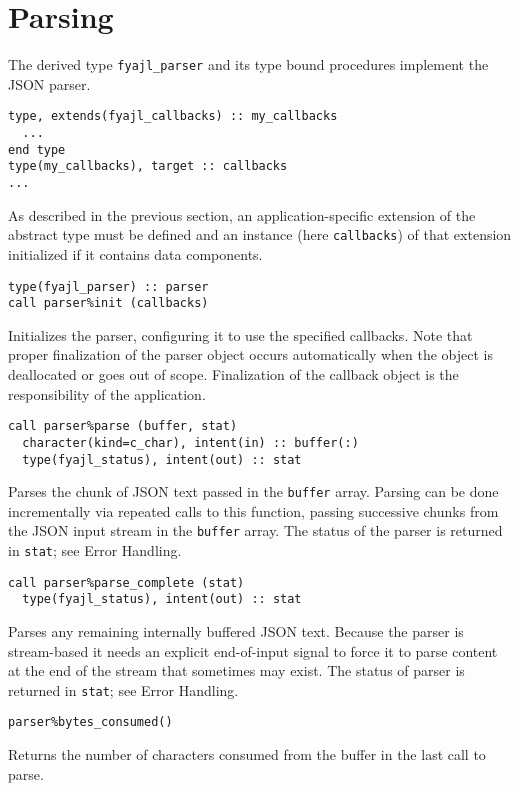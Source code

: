 \documentclass[11pt]{article}
\begin{document}
\section{Parsing}
The derived type \texttt{fyajl_parser} and its type bound procedures
implement the JSON parser.  
\begin{verbatim}
type, extends(fyajl_callbacks) :: my_callbacks
  ...
end type
type(my_callbacks), target :: callbacks
...
\end{verbatim}
As described in the previous section, an application-specific extension of
the abstract type must be defined and an instance (here \texttt{callbacks})
of that extension initialized if it contains data components.
\begin{verbatim}
type(fyajl_parser) :: parser
call parser%init (callbacks)
\end{verbatim}
Initializes the parser, configuring it to use the specified callbacks.
Note that proper finalization of the parser object occurs automatically
when the object is deallocated or goes out of scope.  Finalization of
the callback object is the responsibility of the application.
\begin{verbatim}
call parser%parse (buffer, stat)
  character(kind=c_char), intent(in) :: buffer(:)
  type(fyajl_status), intent(out) :: stat
\end{verbatim}
Parses the chunk of JSON text passed in the \texttt{buffer} array. Parsing
can be done incrementally via repeated calls to this function, passing
successive chunks from the JSON input stream in the \texttt{buffer} array.
The status of the parser is returned in \texttt{stat}; see Error Handling.
\begin{verbatim}
call parser%parse_complete (stat)
  type(fyajl_status), intent(out) :: stat
\end{verbatim}
Parses any remaining internally buffered JSON text.  Because the parser is
stream-based it needs an explicit end-of-input signal to force it to parse
content at the end of the stream that sometimes may exist.  The status of
parser is returned in \texttt{stat}; see Error Handling.
\begin{verbatim}
parser%bytes_consumed()
\end{verbatim}
Returns the number of characters consumed from the buffer in the last
call to parse.
\end{document}

